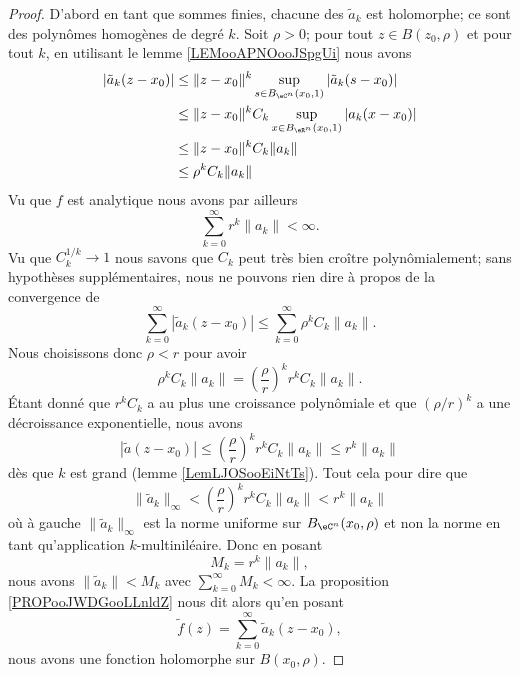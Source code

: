 \begin{proof}
	D'abord en tant que sommes finies, chacune des \( \tilde a_k\) est holomorphe; ce sont des polynômes homogènes de degré \( k\). Soit \( \rho>0\); pour tout \( z\in B(z_0,\rho)\) et pour tout \( k\), en utilisant le lemme \ref{LEMooAPNOooJSpgUi} nous avons
	\begin{subequations}
		\begin{align}
			| \tilde a_k(z-x_0) | & \leq \| z-x_0 \|^k\sup_{s\in B_{\eC^n}(x_0,1)}| \tilde a_k(s-x_0) | \\
			                      & \leq \| z-x_0 \|^kC_k\sup_{x\in B_{\eR^n}(x_0,1)}| a_k(x-x_0) |     \\
			                      & \leq \| z-x_0 \|^kC_k\| a_k \|                                      \\
			                      & \leq \rho^k C_k\| a_k \|
		\end{align}
	\end{subequations}
	Vu que \( f\) est analytique nous avons par ailleurs
	\begin{equation}
		\sum_{k=0}^{\infty}r^k\| a_k \|<\infty.
	\end{equation}
	Vu que \( C_k^{1/k}\to 1\) nous savons que \( C_k\) peut très bien croître polynômialement; sans hypothèses supplémentaires, nous ne pouvons rien dire à propos de la convergence de
	\begin{equation}
		\sum_{k=0}^{\infty}| \tilde a_k(z-x_0) |\leq \sum_{k=0}^{\infty}\rho^k C_k\| a_k \|.
	\end{equation}
	Nous choisissons donc \( \rho<r\) pour avoir
	\begin{equation}
		\rho^kC_k\| a_k \|=\left( \frac{ \rho }{ r } \right)^kr^kC_k\| a_k \|.
	\end{equation}
	Étant donné que \( r^kC_k\) a au plus une croissance polynômiale et que \( (\rho/r)^k\) a une décroissance exponentielle, nous avons
	\begin{equation}
		| \tilde a(z-x_0) |\leq \left( \frac{ \rho }{ r } \right)^kr^kC_k\| a_k \|\leq r^k\| a_k \|
	\end{equation}
	dès que \( k\) est grand (lemme \ref{LemLJOSooEiNtTs}). Tout cela pour dire que
	\begin{equation}
		\| \tilde a_k \|_{\infty}<\left( \frac{ \rho }{ r } \right)^kr^kC_k\| a_k \|<r^k\| a_k \|
	\end{equation}
	où à gauche \( \| \tilde a_k \|_{\infty}\) est la norme uniforme sur \( B_{\eC^n}(x_0,\rho)\) et non la norme en tant qu'application \( k\)-multiniléaire. Donc en posant
	\begin{equation}
		M_k=r^k\| a_k \|,
	\end{equation}
	nous avons \( \| \tilde a_k \|<M_k\) avec \( \sum_{k=0}^{\infty}M_k<\infty\). La proposition \ref{PROPooJWDGooLLnldZ} nous dit alors qu'en posant
	\begin{equation}
		\tilde f(z)=\sum_{k=0}^{\infty}\tilde a_k(z-x_0),
	\end{equation}
	nous avons une fonction holomorphe sur \( B(x_0,\rho)\).


\end{proof}
